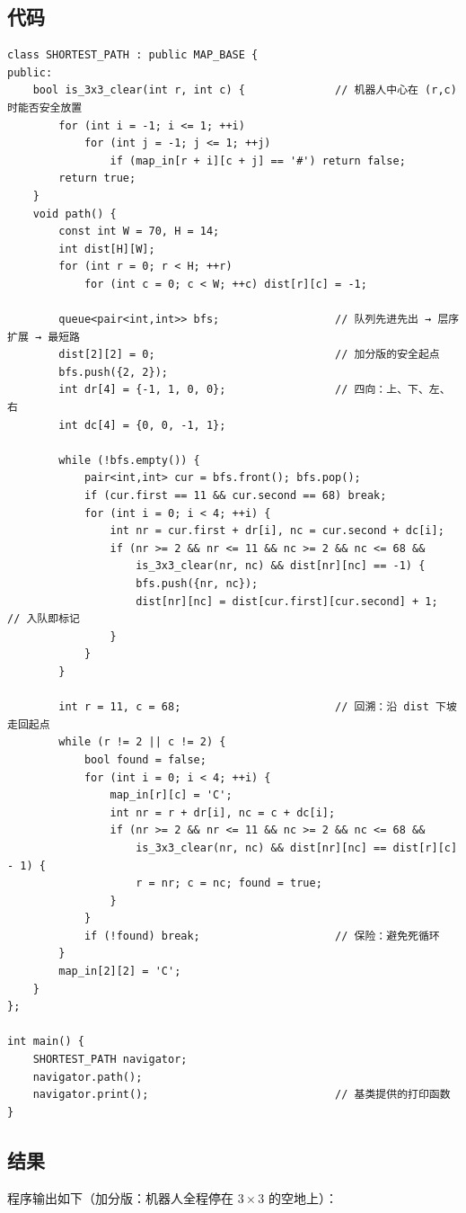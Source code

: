 \subsection{代码}
\begin{lstlisting}
class SHORTEST_PATH : public MAP_BASE {
public:
    bool is_3x3_clear(int r, int c) {              // 机器人中心在 (r,c) 时能否安全放置
        for (int i = -1; i <= 1; ++i)
            for (int j = -1; j <= 1; ++j)
                if (map_in[r + i][c + j] == '#') return false;
        return true;
    }
    void path() {
        const int W = 70, H = 14;
        int dist[H][W];
        for (int r = 0; r < H; ++r)
            for (int c = 0; c < W; ++c) dist[r][c] = -1;

        queue<pair<int,int>> bfs;                  // 队列先进先出 → 层序扩展 → 最短路
        dist[2][2] = 0;                            // 加分版的安全起点
        bfs.push({2, 2});
        int dr[4] = {-1, 1, 0, 0};                 // 四向：上、下、左、右
        int dc[4] = {0, 0, -1, 1};

        while (!bfs.empty()) {
            pair<int,int> cur = bfs.front(); bfs.pop();
            if (cur.first == 11 && cur.second == 68) break;
            for (int i = 0; i < 4; ++i) {
                int nr = cur.first + dr[i], nc = cur.second + dc[i];
                if (nr >= 2 && nr <= 11 && nc >= 2 && nc <= 68 &&
                    is_3x3_clear(nr, nc) && dist[nr][nc] == -1) {
                    bfs.push({nr, nc});
                    dist[nr][nc] = dist[cur.first][cur.second] + 1;   // 入队即标记
                }
            }
        }

        int r = 11, c = 68;                        // 回溯：沿 dist 下坡走回起点
        while (r != 2 || c != 2) {
            bool found = false;
            for (int i = 0; i < 4; ++i) {
                map_in[r][c] = 'C';
                int nr = r + dr[i], nc = c + dc[i];
                if (nr >= 2 && nr <= 11 && nc >= 2 && nc <= 68 &&
                    is_3x3_clear(nr, nc) && dist[nr][nc] == dist[r][c] - 1) {
                    r = nr; c = nc; found = true;
                }
            }
            if (!found) break;                     // 保险：避免死循环
        }
        map_in[2][2] = 'C';
    }
};

int main() {
    SHORTEST_PATH navigator;
    navigator.path();
    navigator.print();                             // 基类提供的打印函数
}
\end{lstlisting}

\subsection{结果}
程序输出如下（加分版：机器人全程停在 $3\times3$ 的空地上）：

